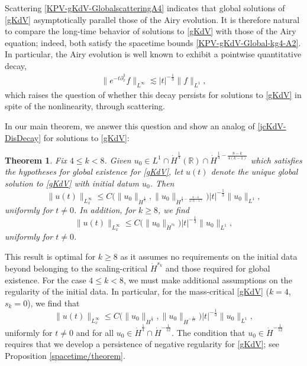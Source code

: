 \documentclass[10pt, reqno]{amsart}
\numberwithin{equation}{section}
\newcommand{\R}{\mathbb{R}}
\newtheorem{theorem}{Theorem}[section]
\theoremstyle{definition}
\theoremstyle{remark}
\begin{document}
Scattering \eqref{KPV-gKdV-GlobalscatteringA4} indicates that global solutions of \eqref{gKdV} asymptotically parallel those of the Airy evolution.
It is therefore natural to compare the long-time behavior of solutions to \eqref{gKdV} with those of the Airy equation; indeed, both satisfy the spacetime bounds \eqref{KPV-gKdV-Global-kg4-A2}.
In particular, the Airy evolution is well known to exhibit a pointwise quantitative decay,
\begin{align}\label{jcKdV-DisDecay}
    \big\|e^{-t\partial^3_x}f\big\|_{L^\infty} \lesssim  |t|^{-\frac{1}{3}} \|f\|_{L^1},
\end{align}
which raises the question of whether this decay persists for solutions to \eqref{gKdV} in spite of the nonlinearity, through scattering.

In our main theorem, we answer this question and show an analog of \eqref{jcKdV-DisDecay} for solutions to \eqref{gKdV}:
\begin{theorem}\label{theorem}
    Fix $4 \leq k < 8$. Given $u_0 \in L^{1}\cap\dot{H}^{\frac{1}{4}}(\R)\cap \dot{H}^{\frac{1}{4} - \frac{8-k}{4(k-1)}}$ which satisfies the hypotheses for global existence for \eqref{gKdV}, let $u(t)$ denote the unique global solution to \eqref{gKdV} with initial datum $u_0$. Then
    \begin{equation}\label{theorem/decay-1}
        \|u(t)\|_{L_x^\infty} \leq C\big(\|u_0\|_{\dot{H}^{\frac{1}{4}}}, \|u_0\|_{\dot{H}^{\frac{1}{4}-\frac{8-k}{4(k-1)}}}\big) |t|^{-\frac{1}{3}} \|u_0\|_{L^{1}},
    \end{equation}
    uniformly for $t \neq 0$.
    In addition, for $k \geq 8$, we find
    \begin{equation}\label{theorem/decay-2}
        \|u(t)\|_{L_x^\infty} \leq C\big(\|u_0\|_{\dot{H}^{s_k}}\big) |t|^{-\frac{1}{3}} \|u_0\|_{L^{1}},
    \end{equation}
    uniformly for $t \neq 0$.
\end{theorem}
This result is optimal for $k \geq 8$ as it assumes no requirements on the initial data beyond belonging to the scaling-critical $\dot{H}^{s_k}$ and those required for global existence. For the case $4 \leq k < 8$, we must make additional assumptions on the regularity of the initial data. In particular, for the mass-critical \eqref{gKdV} ($k = 4$, $s_k = 0$), we find that
\begin{equation*}\label{theorem/decay}
    \|u(t)\|_{L_x^\infty} \leq C\big(\|u_0\|_{\dot{H}^{\frac{1}{4}}}, \|u_0\|_{\dot{H}^{-\frac{1}{12}}}\big) |t|^{-\frac{1}{3}} \|u_0\|_{L^{1}},
\end{equation*}
uniformly for $t \neq 0$ and for all $u_0 \in \dot{H}^{\frac{1}{4}}\cap \dot{H}^{-\frac{1}{12}}$. The condition that $u_0 \in \dot{H}^{-\frac{1}{12}}$ requires that we develop a persistence of negative regularity for \eqref{gKdV}; see Proposition \ref{spacetime/theorem}.
\end{document}
